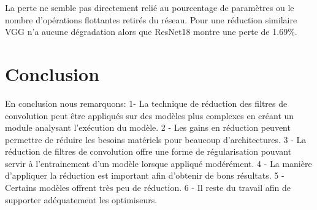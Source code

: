 \documentclass[12pt]{article}
\begin{document}
La perte ne semble pas directement relié au pourcentage de paramètres ou le nombre d'opérations flottantes retirés du réseau. Pour une réduction similaire VGG n'a aucune dégradation alors que ResNet18 montre une perte de 1.69\%.

\section*{Conclusion}
En conclusion nous remarquons: 1- La technique de réduction des filtres de convolution peut être appliqués sur des modèles plus complexes en créant un module analysant l’exécution du modèle. 2 - Les gains en réduction peuvent permettre de réduire les besoins matériels pour beaucoup d’architectures. 3 - La réduction de filtres de convolution offre une forme de régularisation pouvant servir à l’entrainement d'un modèle lorsque appliqué modérément. 4 - La manière d’appliquer la réduction est important afin d'obtenir de bons résultats. 5 - Certains modèles offrent très peu de réduction. 6 - Il reste du travail afin de supporter adéquatement les optimiseurs.

\newpage



\end{document}
